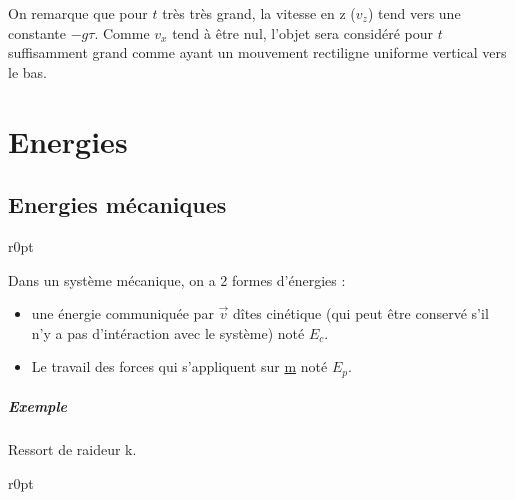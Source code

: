 On remarque que pour $t$ très très grand, la vitesse en z ($v_z$) tend vers une constante $-g \tau$. Comme $v_x$ tend à être nul, l'objet sera considéré pour $t$ suffisamment grand comme ayant un mouvement rectiligne uniforme vertical vers le bas.


\chapter{Energies}
\section{Energies mécaniques}
\begin{wrapfigure}[5]{r}{0pt}

\end{wrapfigure}

Dans un système mécanique, on a 2 formes d'énergies : 
\begin{itemize}
	\item une énergie communiquée par $\vec{v}$ dîtes cinétique (qui peut être conservé s'il n'y a pas d'intéraction avec le système) noté $E_c$.
	\item Le travail des forces qui s'appliquent sur \ul{m} noté $E_p$.
\end{itemize}

\paragraph{Exemple}

Ressort de raideur k.

\begin{wrapfigure}[7]{r}{0pt}
\end{wrapfigure}

